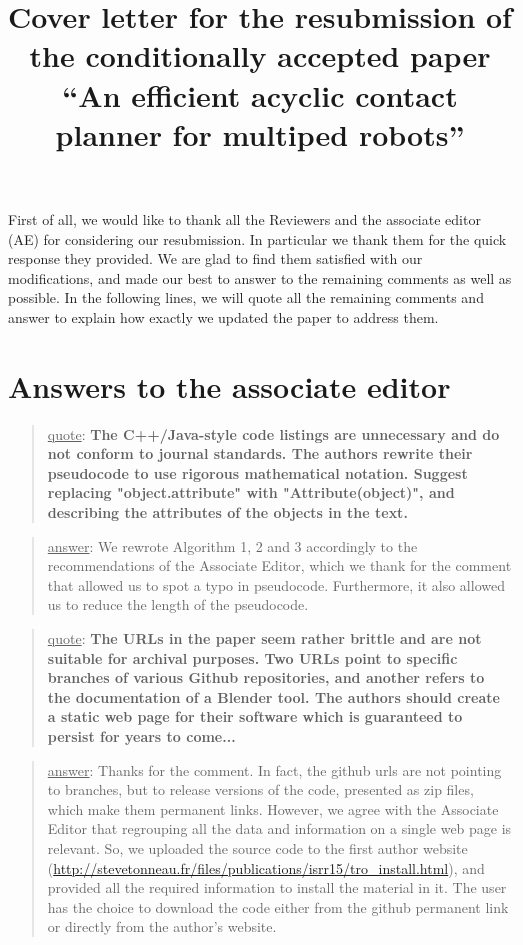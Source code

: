 \documentclass[a4paper]{article}
\author {}
\title {Cover letter for the resubmission of the conditionally accepted paper ``An efficient acyclic contact planner for multiped robots''}
\date {}
\newcommand\quot[1]{\begin{quote} \underline{quote}: \textbf{#1}\end{quote}}
\newcommand\as[1]{\begin{quote} \underline{answer}: {#1}\end{quote} }
\begin{document}
\maketitle


First of all, we would like to thank all the Reviewers and the associate editor (AE) for considering our resubmission.
In particular we thank them for the quick response they provided.
We are glad to find them satisfied with our modifications, and made our best to answer to the remaining comments as well as possible.
In the following lines, we will quote all the remaining comments and answer to explain how exactly we updated the paper to address them.


\section{Answers to the associate editor}

\quot {The C++/Java-style code listings are unnecessary and do not conform
to journal standards.  The authors rewrite their pseudocode to use
rigorous mathematical notation.  Suggest replacing "object.attribute"
with "Attribute(object)", and describing the attributes of the objects
in the text.
}

\as{We rewrote Algorithm 1, 2 and 3 accordingly to the recommendations of the Associate Editor, which we thank for the comment that allowed us to spot
a typo in pseudocode. Furthermore, it also allowed us to reduce the length of the pseudocode.}
\leavevmode 
\quot {The URLs in the paper seem rather brittle and are not suitable for
archival purposes.  Two URLs point to specific branches of various
Github repositories, and another refers to the documentation of a
Blender tool.  The authors should create a static web page for their
software which is guaranteed to persist for years to come... }

\as{Thanks for the comment. In fact, the github urls are not pointing to branches, but to release versions of the code, presented as zip files, which make them permanent
links. However, we agree with the Associate Editor that regrouping all the data and information on a single web page is relevant. So, we uploaded the source code to the first author
website (\url{http://stevetonneau.fr/files/publications/isrr15/tro_install.html}), and provided all the required information to install the material in it. The user has the choice to download the code either from the github permanent link or directly from the author's website.}
\end{document}
